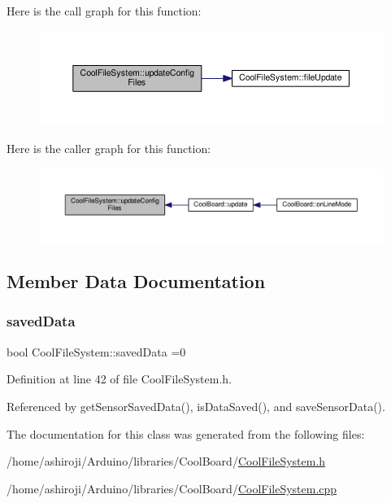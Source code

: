 Here is the call graph for this function\+:
\nopagebreak
\begin{figure}[H]
\begin{center}
\leavevmode
\includegraphics[width=350pt]{classCoolFileSystem_adfa8e2e80641ae6f0cceabd348a9b841_cgraph}
\end{center}
\end{figure}
Here is the caller graph for this function\+:
\nopagebreak
\begin{figure}[H]
\begin{center}
\leavevmode
\includegraphics[width=350pt]{classCoolFileSystem_adfa8e2e80641ae6f0cceabd348a9b841_icgraph}
\end{center}
\end{figure}


\subsection{Member Data Documentation}
\mbox{\label{classCoolFileSystem_ad398e0c5c41a0c88acdf5d672aa71351}} 
\subsubsection{\texorpdfstring{saved\+Data}{savedData}}
{\footnotesize\ttfamily bool Cool\+File\+System\+::saved\+Data =0\hspace{0.3cm}{\ttfamily [private]}}



Definition at line 42 of file Cool\+File\+System.\+h.



Referenced by get\+Sensor\+Saved\+Data(), is\+Data\+Saved(), and save\+Sensor\+Data().



The documentation for this class was generated from the following files\+:\begin{DoxyCompactItemize}
\item 
/home/ashiroji/\+Arduino/libraries/\+Cool\+Board/\hyperlink{CoolFileSystem_8h}{Cool\+File\+System.\+h}\item 
/home/ashiroji/\+Arduino/libraries/\+Cool\+Board/\hyperlink{CoolFileSystem_8cpp}{Cool\+File\+System.\+cpp}\end{DoxyCompactItemize}
